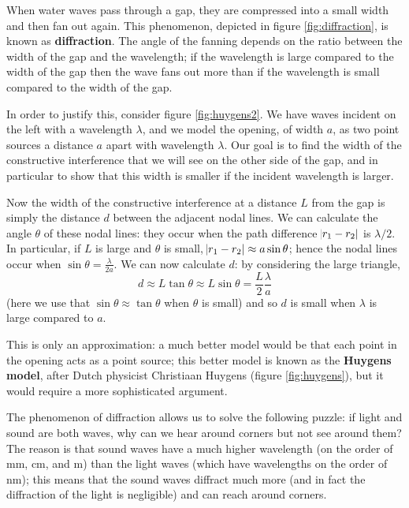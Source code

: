 \documentclass[a4paper]{amsbook}
\begin{document}
When water waves pass through a gap, they are compressed into a small width and then fan out again. This phenomenon, depicted in
figure \ref{fig:diffraction}, is known as \textbf{diffraction}. The angle of the fanning depends on the ratio between the width of the
gap and the wavelength; if the wavelength is large compared to the width of the gap then the wave fans out more than if the wavelength
is small compared to the width of the gap.

In order to justify this, consider figure \ref{fig:huygens2}. We have waves incident on the left with a wavelength $ \lambda $, and we model
the opening, of width $ a $, as two point sources a distance $ a $ apart with wavelength $ \lambda $. Our goal is to find the width of the
constructive interference that we will see on the other side of the gap, and in particular to show that this width is smaller if the incident
wavelength is larger.

Now the width of the constructive interference at a distance $ L $ from the gap is simply the distance $ d $ between the adjacent nodal
lines. We can calculate the angle $ \theta $ of these nodal lines: they occur when the path difference $ \abs{r_1 - r_2} $ is $ \lambda/2$. In
particular, if $ L $ is large and $ \theta $ is small, $ \abs{r_1 - r_2} \approx a \sin \theta $; hence the nodal lines occur
when $ \sin \theta = \frac{\lambda}{2a} $. We can now calculate $ d $: by considering the large triangle,
\begin{displaymath}
  d \approx L \tan \theta \approx L \sin \theta = \frac{L}{2} \frac{\lambda}{a}
\end{displaymath}
(here we use that $ \sin \theta \approx \tan \theta $ when $ \theta $ is small) and so $ d $ is small when $ \lambda $ is large compared to $ a $.

This is only an approximation: a much better model would be that each point in the opening acts as a point source; this better model is known as
the \textbf{Huygens model}, after Dutch physicist Christiaan Huygens (figure \ref{fig:huygens}), but it would require a more sophisticated argument.

The phenomenon of diffraction allows us to solve the following puzzle: if light and sound are both waves, why can we hear around corners but
not see around them? The reason is that sound waves have a much higher wavelength (on the order of mm, cm, and m) than the light waves (which
have wavelengths on the order of nm); this means that the sound waves diffract much more (and in fact the diffraction of the light is negligible)
and can reach around corners.
\end{document}
